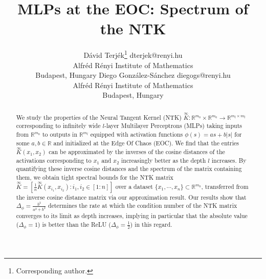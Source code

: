 \documentclass[twoside,11pt]{article}
\newcommand{\R}{\mathbb{R}}
\newcommand{\limiting}[1]{\overset{\scriptscriptstyle\infty}{#1}}
\begin{document}
\title{MLPs at the EOC: Spectrum of the NTK}

\author{
  \name D\'avid Terj\'ek\thanks{Corresponding author.}
  \email dterjek@renyi.hu \\
  \addr Alfr\'ed R\'enyi Institute of Mathematics \\ Budapest, Hungary
  \AND
  \name Diego Gonz\'alez-S\'anchez
  \email diegogs@renyi.hu \\
  \addr Alfr\'ed R\'enyi Institute of Mathematics \\ Budapest, Hungary
}

\editor{}

\maketitle

\begin{abstract}%
We study the properties of the Neural Tangent Kernel (NTK) $\limiting{K} : \R^{m_0} \times \R^{m_0} \to \R^{m_l \times m_l}$ corresponding to infinitely wide $l$-layer Multilayer Perceptrons (MLPs) taking inputs from $\R^{m_0}$ to outputs in $\R^{m_l}$ equipped with activation functions $\phi(s) = a s + b \vert s \vert$ for some $a,b \in \R$ and initialized at the Edge Of Chaos (EOC). We find that the entries $\limiting{K}(x_1,x_2)$ can be approximated by the inverses of the cosine distances of the activations corresponding to $x_1$ and $x_2$ increasingly better as the depth $l$ increases. By quantifying these inverse cosine distances and the spectrum of the matrix containing them, we obtain tight spectral bounds for the NTK matrix $\limiting{K} = [\frac{1}{n} \limiting{K}(x_{i_1},x_{i_2}) : i_1, i_2 \in [1:n]]$ over a dataset $\{x_1,\cdots,x_n\} \subset \R^{m_0}$, transferred from the inverse cosine distance matrix via our approximation result. Our results show that $\Delta_\phi = \frac{b^2}{a^2+b^2}$ determines the rate at which the condition number of the NTK matrix converges to its limit as depth increases, implying in particular that the absolute value ($\Delta_\phi=1$) is better than the ReLU ($\Delta_\phi=\frac{1}{2}$) in this regard.
\end{abstract}

\end{document}
